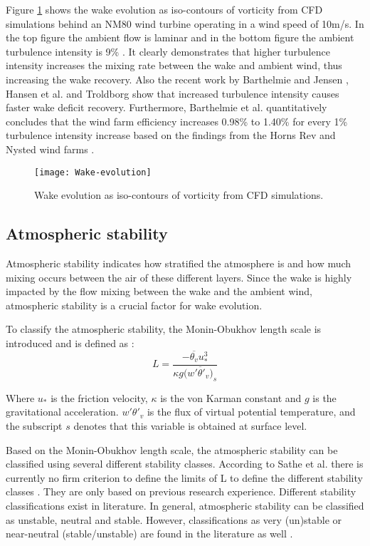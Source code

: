 \documentclass{umthesis}
\begin{document}
Figure \ref{fig:Wake_evolution} \cite{Troldborg_ACL} shows the wake evolution as iso-contours of vorticity from CFD simulations behind an NM80 wind turbine operating in a wind speed of 10m/s. In the top figure the ambient flow is laminar and in the bottom figure the ambient turbulence intensity is 9\% \cite{Troldborg_ACL}. It clearly demonstrates that higher turbulence intensity increases the mixing rate between the wake and ambient wind, thus increasing the wake recovery. Also the recent work by Barthelmie and Jensen \cite{Barthelmie_Evaluation}, Hansen et al. \cite{TI_impact} and Troldborg \cite{Troldborg_ACL} show that increased turbulence intensity causes faster wake deficit recovery. Furthermore, Barthelmie et al. quantitatively concludes that the wind farm efficiency increases 0.98\% to 1.40\% for every 1\% turbulence intensity increase based on the findings from the Horns Rev and Nysted wind farms \cite{Meteorological_controls}.

\begin{figure}
  \centering
  \texttt{[image: Wake-evolution]}
  \caption{Wake evolution as iso-contours of vorticity from CFD simulations.}\label{fig:Wake_evolution}
\end{figure}


\subsection{Atmospheric stability}
Atmospheric stability indicates how stratified the atmosphere is and how much mixing occurs between the air of these different layers. Since the wake is highly impacted by the flow mixing between the wake and the ambient wind, atmospheric stability is a crucial factor for wake evolution.

To classify the atmospheric stability, the Monin-Obukhov length scale is introduced and is defined as \cite{Stull}:
\begin{equation}
  L=\frac{-\overline{\theta_v}u_*^3}{\kappa g(\overline{w'\theta '_v)}_s }
\end{equation}

Where $u_*$ is the friction velocity, $\kappa$ is the von Karman constant and $g$ is the gravitational acceleration. $w'\theta '_v$ is the flux of virtual potential temperature, and the subscript $s$ denotes that this variable is obtained at surface level.

Based on the Monin-Obukhov length scale, the atmospheric stability can be classified using several different stability classes. According to Sathe et al. there is currently no firm criterion to define the limits of L to define the different stability classes \cite{Sathe}. They are only based on previous research experience. Different stability classifications exist in literature. In general, atmospheric stability can be classified as unstable, neutral and stable. However, classifications as very (un)stable or near-neutral (stable/unstable) are found in the literature as well \cite{Sathe}\cite{Barthelmie_as}\cite{Ten_years}\cite{Sathe_sitedata}\cite{Wharton_1}\cite{Wharton_2}.
\end{document}
